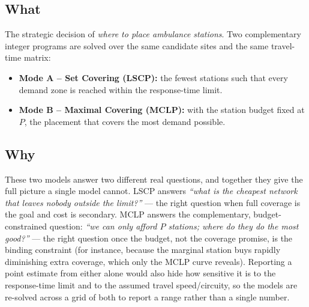 \documentclass[11pt]{article}
\begin{document}
\subsection*{What}
The strategic decision of \emph{where to place ambulance stations}. Two
complementary integer programs are solved over the same candidate sites and
the same travel-time matrix:
\begin{itemize}
  \item \textbf{Mode A -- Set Covering (LSCP):} the fewest stations such that
    every demand zone is reached within the response-time limit.
  \item \textbf{Mode B -- Maximal Covering (MCLP):} with the station budget
    fixed at $P$, the placement that covers the most demand possible.
\end{itemize}

\subsection*{Why}
These two models answer two different real questions, and together they give
the full picture a single model cannot. LSCP answers \emph{``what is the
cheapest network that leaves nobody outside the limit?''} --- the right
question when full coverage is the goal and cost is secondary. MCLP answers
the complementary, budget-constrained question: \emph{``we can only afford
$P$ stations; where do they do the most good?''} --- the right question once
the budget, not the coverage promise, is the binding constraint (for
instance, because the marginal station buys rapidly diminishing extra
coverage, which only the MCLP curve reveals). Reporting a point estimate from
either alone would also hide how sensitive it is to the response-time limit
and to the assumed travel speed/circuity, so the models are re-solved across
a grid of both to report a range rather than a single number.
\end{document}
